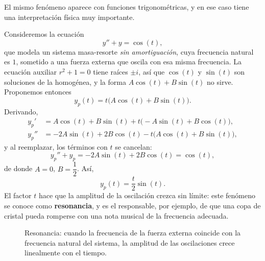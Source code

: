 El mismo fen\'omeno aparece con funciones trigonom\'etricas, y en ese caso tiene una interpretaci\'on f\'isica muy importante.

\begin{example}[Resonancia]
    Consideremos la ecuaci\'on
    \[
    y''+y=\cos(t),
    \]
    que modela un sistema masa-resorte \emph{sin amortiguaci\'on}, cuya frecuencia natural es $1$, sometido a una fuerza externa que oscila con esa misma frecuencia. La ecuaci\'on auxiliar $r^2+1=0$ tiene ra\'ices $\pm i$, as\'i que $\cos(t)$ y $\sin(t)$ son soluciones de la homog\'enea, y la forma $A\cos(t)+B\sin(t)$ no sirve. Proponemos entonces
    \[
    y_p(t)=t\big(A\cos(t)+B\sin(t)\big).
    \]
    Derivando,
    \begin{align*}
        y_p'&=A\cos(t)+B\sin(t)+t\big(-A\sin(t)+B\cos(t)\big),\\
        y_p''&=-2A\sin(t)+2B\cos(t)-t\big(A\cos(t)+B\sin(t)\big),
    \end{align*}
    y al reemplazar, los t\'erminos con $t$ se cancelan:
    \[
    y_p''+y_p=-2A\sin(t)+2B\cos(t)=\cos(t),
    \]
    de donde $A=0$, $B=\dfrac{1}{2}$. As\'i,
    \[
    y_p(t)=\dfrac{t}{2}\sin(t).
    \]
    El factor $t$ hace que la amplitud de la oscilaci\'on crezca sin l\'imite: este fen\'omeno se conoce como \textbf{resonancia}, y es el responsable, por ejemplo, de que una copa de cristal pueda romperse con una nota musical de la frecuencia adecuada.
\end{example}

\begin{figure}[h!]
    \centering
    \caption{Resonancia: cuando la frecuencia de la fuerza externa coincide con la frecuencia natural del sistema, la amplitud de las oscilaciones crece linealmente con el tiempo.}
    \label{fig:resonancia}
\end{figure}

